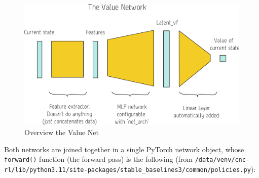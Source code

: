 \documentclass[
  letterpaper,
  DIV=11,
  numbers=noendperiod]{scrartcl}
\begin{document}
\begin{figure}

{\centering \includegraphics{img/ValueNet.png}

}

\caption{Overview the Value Net}

\end{figure}

Both networks are joined together in a single PyTorch network object,
whose \texttt{forward()} function (the forward pass) is the following
(from
\texttt{/data/venv/cnc-rl/lib/python3.11/site-packages/stable\_baselines3/common/policies.py}):
\end{document}
